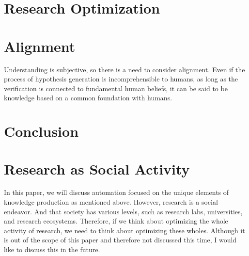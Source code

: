 \documentclass{book}
\begin{document}
\chapter{Research Optimization}

\chapter{Alignment}
Understanding is subjective, so there is a need to consider alignment. Even if the process of hypothesis generation is incomprehensible to humans, as long as the verification is connected to fundamental human beliefs, it can be said to be knowledge based on a common foundation with humans.

\chapter{Conclusion}


% 



\appendix
\chapter{Research as Social Activity}
In this paper, we will discuss automation focused on the unique elements of knowledge production as mentioned above. However, research is a social endeavor. And that society has various levels, such as research labs, universities, and research ecosystems. Therefore, if we think about optimizing the whole activity of research, we need to think about optimizing these wholes. Although it is out of the scope of this paper and therefore not discussed this time, I would like to discuss this in the future.
\end{document}
